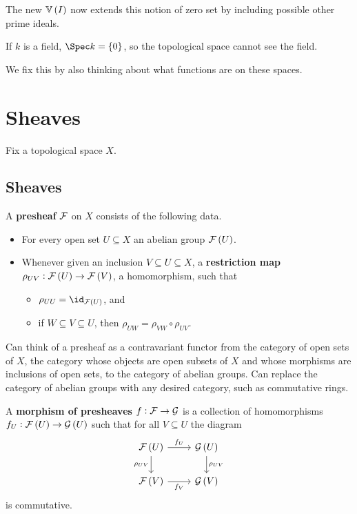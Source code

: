 The new $ \VV\br{I} $ now extends this notion of zero set by including possible other prime ideals.

\begin{example*}
If $ k $ is a field, $ \Spec k = \cbr{0} $, so the topological space cannot see the field.
\end{example*}

We fix this by also thinking about what functions are on these spaces.

\pagebreak

\section{Sheaves}

Fix a topological space $ X $.

\subsection{Sheaves}

\begin{definition*}
A \textbf{presheaf} $ \mathcal{F} $ on $ X $ consists of the following data.
\begin{itemize}
\item For every open set $ U \subseteq X $ an abelian group $ \FFF\br{U} $.
\item Whenever given an inclusion $ V \subseteq U \subseteq X $, a \textbf{restriction map} $ \rho_{UV} : \FFF\br{U} \to \FFF\br{V} $, a homomorphism, such that
\begin{itemize}
\item $ \rho_{UU} = \id_{\FFF\br{U}} $, and
\item if $ W \subseteq V \subseteq U $, then $ \rho_{UW} = \rho_{VW} \circ \rho_{UV} $.
\end{itemize}
\end{itemize}
\end{definition*}

\begin{remark*}
Can think of a presheaf as a contravariant functor from the category of open sets of $ X $, the category whose objects are open subsets of $ X $ and whose morphisms are inclusions of open sets, to the category of abelian groups. Can replace the category of abelian groups with any desired category, such as commutative rings.
\end{remark*}

\begin{definition*}
A \textbf{morphism of presheaves} $ f : \mathcal{F} \to \mathcal{G} $ is a collection of homomorphisms $ f_U : \FFF\br{U} \to \GGG\br{U} $ such that for all $ V \subseteq U $ the diagram
$$
\begin{tikzcd}
\FFF\br{U} \arrow{r}{f_U} \arrow{d}[swap]{\rho_{UV}} & \GGG\br{U} \arrow{d}{\rho_{UV}} \\
\FFF\br{V} \arrow{r}[swap]{f_V} & \GGG\br{V}
\end{tikzcd}
$$
is commutative.
\end{definition*}

